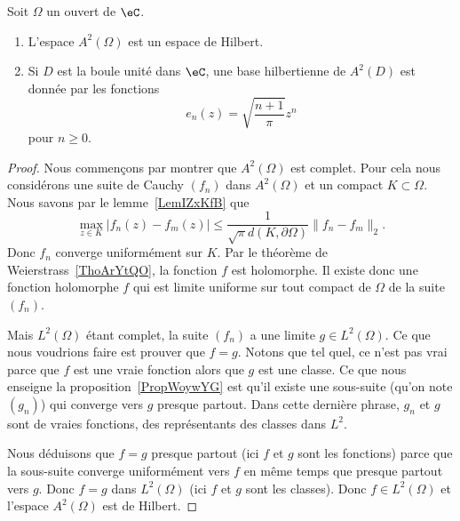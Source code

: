 \begin{theorem}
	Soit \( \Omega\) un ouvert de \( \eC\).
	\begin{enumerate}
		\item
		      L'espace \( A^2(\Omega)\) est un espace de Hilbert.
		\item
		      Si \( D\) est la boule unité dans \( \eC\), une base hilbertienne de \( A^2(D)\) est donnée par les fonctions
		      \begin{equation}
			      e_n(z)=\sqrt{\frac{ n+1 }{ \pi }}z^n
		      \end{equation}
		      pour \( n\geq 0\).
	\end{enumerate}
\end{theorem}

\begin{proof}
	Nous commençons par montrer que \( A^2(\Omega)\) est complet. Pour cela nous considérons une suite de Cauchy \( (f_n)\) dans \( A^2(\Omega)\) et un compact \( K\subset \Omega\). Nous savons par le lemme~\ref{LemIZxKfB} que
	\begin{equation}
		\max_{z\in K}\big| f_n(z)-f_m(z) \big|\leq \frac{1}{ \sqrt{\pi}d(K,\partial\Omega) }\| f_n-f_m \|_2.
	\end{equation}
	Donc \( f_n\) converge uniformément sur \( K\). Par le théorème de Weierstrass~\ref{ThoArYtQO}, la fonction \( f\) est holomorphe. Il existe donc une fonction holomorphe \( f\) qui est limite uniforme sur tout compact de \( \Omega\) de la suite \( (f_n)\).

	Mais \( L^2(\Omega)\) étant complet, la suite \( (f_n)\) a une limite \( g\in L^2(\Omega)\). Ce que nous voudrions faire est prouver que \( f=g\). Notons que tel quel, ce n'est pas vrai parce que \( f\) est une vraie fonction alors que \( g\) est une classe. Ce que nous enseigne la proposition~\ref{PropWoywYG} est qu'il existe une sous-suite (qu'on note \( (g_n)\)) qui converge vers \( g\) presque partout. Dans cette dernière phrase, \( g_n\) et \( g\) sont de vraies fonctions, des représentants des classes dans \( L^2\).

	Nous déduisons que \( f=g\) presque partout (ici \( f\) et \( g\) sont les fonctions) parce que la sous-suite converge uniformément vers \( f\) en même temps que presque partout vers \( g\). Donc \( f=g\) dans \( L^2(\Omega)\) (ici \( f\) et \( g\) sont les classes). Donc \( f\in L^2(\Omega)\) et l'espace \( A^2(\Omega)\) est de Hilbert.


\end{proof}
